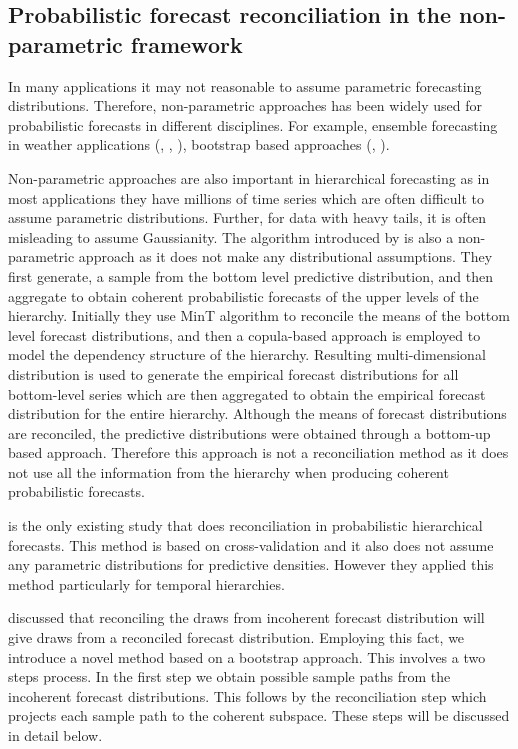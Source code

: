 \documentclass[graybox]{svmult}
\begin{document}
\subsection{Probabilistic forecast reconciliation in the non-parametric framework}

In many applications it may not reasonable to assume parametric forecasting distributions. Therefore, non-parametric approaches has been widely used for probabilistic forecasts in different disciplines. For example, ensemble forecasting in weather applications (\cite{Gneiting2005}, \cite{Gneiting2014}, \cite{Gneiting2008}), bootstrap based approaches (\cite{Manzan2008}, \cite{Vilar2013}).

Non-parametric approaches are also important in hierarchical forecasting as in most applications they have millions of time series which are often difficult to assume parametric distributions. Further, for data with heavy tails, it is often misleading to assume Gaussianity. The algorithm introduced by \cite{Taieb2017} is also a non-parametric approach as it does not make any distributional assumptions. They first generate, a sample from the bottom level predictive distribution, and then aggregate to obtain coherent probabilistic forecasts of the upper levels of the hierarchy. Initially they use MinT algorithm to reconcile the means of the bottom level forecast distributions, and then a copula-based approach is employed to model the dependency structure of the hierarchy. Resulting multi-dimensional distribution is used to generate the empirical forecast distributions for all bottom-level series which are then aggregated to obtain the empirical forecast distribution for the entire hierarchy. Although the means of forecast distributions are reconciled, the predictive distributions were obtained through a bottom-up based approach. Therefore this approach is not a reconciliation method as it does not use all the information from the hierarchy when producing coherent probabilistic forecasts.

\cite{Jeon2018} is the only existing study that does reconciliation in probabilistic hierarchical forecasts. This method is based on cross-validation and it also does not assume any parametric distributions for predictive densities. However they applied this method particularly for temporal hierarchies.

\cite{Gamakumara2018} discussed that reconciling the draws from incoherent forecast distribution will give draws from a reconciled forecast distribution. Employing this fact, we introduce a novel method based on a bootstrap approach. This involves a two steps process. In the first step we obtain possible sample paths from the incoherent forecast distributions. This follows by the reconciliation step which projects each sample path to the coherent subspace. These steps will be discussed in detail below.
\end{document}
